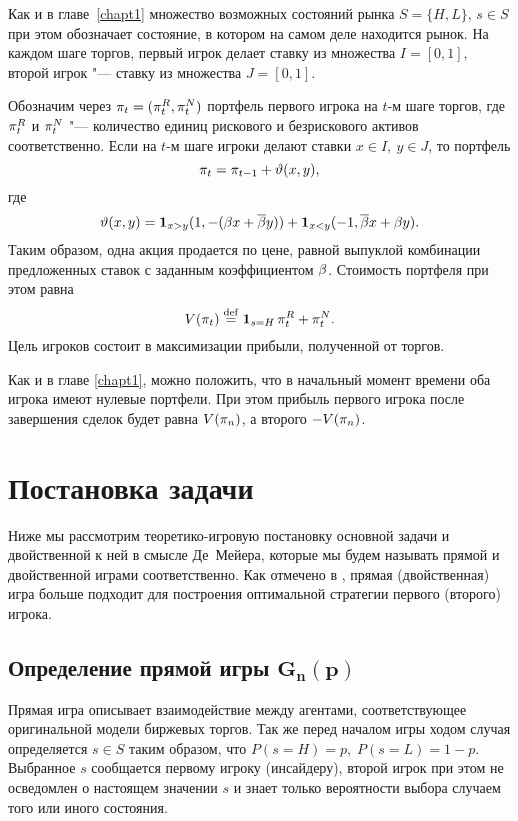 {Как и в главе~\ref{chapt1} множество возможных состояний рынка $S = \{H, L\}$, $s \in S$ при этом обозначает состояние, в котором на самом деле находится рынок.
На каждом шаге торгов, первый игрок делает ставку из множества $I = [0, 1]$, второй игрок "--- ставку из множества $J = [0,1]$.

Обозначим через $\pi_{t} = (\pi_{t}^R, \pi_{t}^N)$ портфель первого игрока на $t$-м шаге торгов, где $\pi_{t}^R$ и $\pi_{t}^N$ "--- количество единиц рискового и безрискового активов соответственно.
Если на $t$-м шаге игроки делают ставки $x \in I,\ y \in J$, то портфель 
\[
\pi_{t} = \pi_{t-1} + \vartheta(x, y),
\]
где
\begin{equation}\label{ch3:eq:trans-mech}
  \vartheta(x, y) = \mathbf{1}_{x > y} (1, -(\beta x + {{\overline{\beta}}} y)) +
  \mathbf{1}_{x < y} (-1, {{\overline{\beta}}} x + \beta y).
\end{equation}
Таким образом, одна акция продается по цене, равной выпуклой комбинации предложенных ставок с заданным коэффициентом $\beta$.
Стоимость портфеля при этом равна
\begin{equation*}
  V(\pi_{t}) \overset{\mathrm{def}}{=} \mathbf{1}_{s = H} \, \pi_{t}^R + \pi_{t}^N.
\end{equation*}
Цель игроков состоит в максимизации прибыли, полученной от торгов.

Как и в главе \ref{chapt1}, можно положить, что в начальный момент времени оба игрока имеют нулевые портфели.
При этом прибыль первого игрока после завершения сделок будет равна $V(\pi_{n})$, а второго $-V(\pi_{n})$.

\section{Постановка задачи}
\label{ch3:sec:formal-descr}

Ниже мы рассмотрим теоретико-игровую постановку основной задачи и двойственной к ней в смысле Де~Мейера, которые мы будем называть прямой и двойственной играми соответственно.
Как отмечено в \cite{demeyer02}, прямая (двойственная) игра больше подходит для построения оптимальной стратегии первого (второго) игрока.

\subsection{Определение прямой игры $\mathbf{ G_{n}(p) }$}
Прямая игра описывает взаимодействие между агентами, соответствующее оригинальной модели биржевых торгов.
Так же перед началом игры ходом случая определяется $s \in S$ таким образом, что $P(s = H) = p, \; P(s = L) = 1-p$.
Выбранное $s$ сообщается первому игроку (инсайдеру), второй игрок при этом не осведомлен о настоящем значении $s$ и знает только вероятности выбора случаем того или иного состояния.

}
